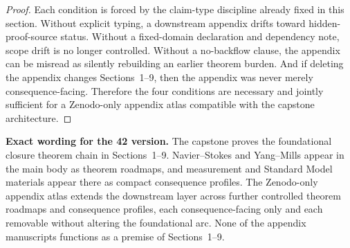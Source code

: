 \begin{proof}
Each condition is forced by the claim-type discipline already fixed in this section. Without explicit typing, a downstream appendix drifts toward hidden-proof-source status. Without a fixed-domain declaration and dependency note, scope drift is no longer controlled. Without a no-backflow clause, the appendix can be misread as silently rebuilding an earlier theorem burden. And if deleting the appendix changes Sections~1--9, then the appendix was never merely consequence-facing. Therefore the four conditions are necessary and jointly sufficient for a Zenodo-only appendix atlas compatible with the capstone architecture.
\end{proof}

\begin{fixedbox}
\textbf{Exact wording for the 42 version.} The capstone proves the foundational closure theorem chain in Sections~1--9. Navier--Stokes and Yang--Mills appear in the main body as theorem roadmaps, and measurement and Standard Model materials appear there as compact consequence profiles. The Zenodo-only appendix atlas extends the downstream layer across further controlled theorem roadmaps and consequence profiles, each consequence-facing only and each removable without altering the foundational arc. None of the appendix manuscripts functions as a premise of Sections~1--9.
\end{fixedbox}
